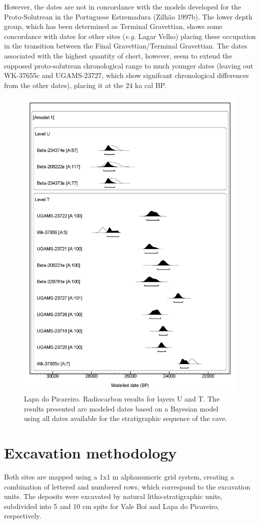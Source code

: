 \documentclass[12pt,twoside]{reedthesis}
\begin{document}
However, the dates are not in concordance with the models developed for the Proto-Solutrean in the Portuguese Estremadura (Zilhão 1997b). The lower depth group, which has been determined as Terminal Gravettian, shows some concordance with dates for other sites (\emph{e.g.} Lagar Velho) placing these occupation in the transition between the Final Gravettian/Terminal Gravettian. The dates associated with the highest quantity of chert, however, seem to extend the supposed proto-solutrean chronological range to much younger dates (leaving out WK-37655c and UGAMS-23727, which show signifcant chronological differences from the other dates), placing it at the 24 ka cal BP.
\begin{figure}

{\centering \includegraphics[width=0.6\linewidth]{figure/c14_LP} 

}

\caption{Lapa do Picareiro. Radiocarbon results for layers U and T. The results presented are modeled dates based on a Bayesian model using all dates available for the stratigraphic sequence of the cave.}\label{fig:c14LP}
\end{figure}
\hypertarget{excavation-methodology}{%
\section{Excavation methodology}\label{excavation-methodology}}

Both sites are mapped using a 1x1 m alphanumeric grid system, creating a combination of lettered and numbered rows, which correspond to the excavation units. The deposits were excavated by natural litho-stratigraphic units, subdivided into 5 and 10 cm spits for Vale Boi and Lapa do Picareiro, respectively.
\end{document}
